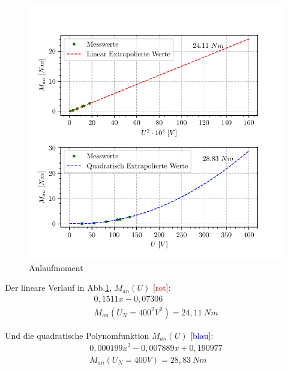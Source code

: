 \documentclass[conference]{IEEEtran}
\begin{document}
\vspace{-7ex}
\begin{figure}[htbp]
    \centering
    \includegraphics[width=\columnwidth]{./anlaufmoment.pdf}
    \caption{Anlaufmoment}
    \label{fig:Anlaufmoment}
\end{figure}

Der lineare Verlauf in Abb.\ref{fig:Anlaufmoment}, $M_{an}(U)$ [\textcolor{red}{rot}]:
\begin{gather*}
    0,1511 x - 0,07306 \\
    M_{an}(U_N=400^2V^2)=24,11\ \si{Nm}
\end{gather*}

Und die quadratische Polynomfunktion $M_{an}(U)$ [\textcolor{blue}{blau}]:
\begin{gather*}
    0,000199 x^2 -0,007889 x + 0,190977\\
    M_{an}(U_N=400V)=28,83\ \si{Nm}
\end{gather*}
\end{document}
